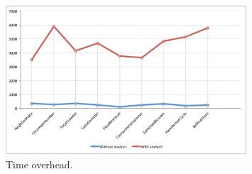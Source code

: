 
\begin{figure}[htb]
  
\centering
\centering
 \includegraphics[width=0.8\textwidth]{./Images/overhead.pdf}
 \caption{Time overhead.}

\end{figure}


